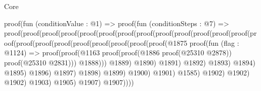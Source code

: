 \begin{lexlean}{Core}
\begin{coremodule}
                                  proof(fun (conditionValue : @1) =>
                                    proof(fun (conditionSteps : @7) =>
                                      proof(proof(proof(proof(proof(proof(proof(proof(proof(proof(proof(proof(proof(proof(proof(proof(proof(proof(proof(proof(proof(proof(@1875
                                                                                    proof(fun (flag : @1124) =>
                                                                                      proof(proof(@1163
                                                                                            proof(proof(@1886
                                                                                                  proof(@25310
                                                                                                      @2878))
                                                                                                proof(@25310
                                                                                                    @2831)))
                                                                                          @1888)))
                                                                                  @1889)
                                                                                @1890)
                                                                              @1891)
                                                                            @1892)
                                                                          @1893)
                                                                        @1894)
                                                                      @1895)
                                                                    @1896)
                                                                  @1897)
                                                                @1898)
                                                              @1899)
                                                            @1900)
                                                          @1901)
                                                        @1585)
                                                      @1902)
                                                    @1902)
                                                  @1902)
                                                @1903)
                                              @1905)
                                            @1907)
                                          @1907))))

\end{coremodule}
\end{lexlean}

